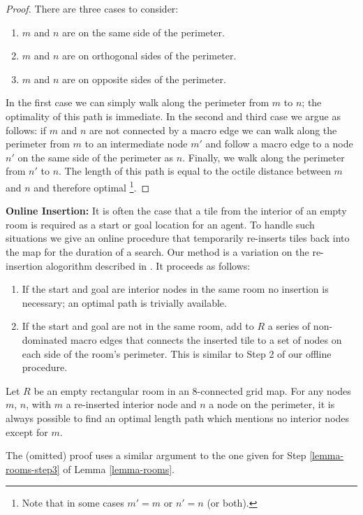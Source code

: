 \begin{proof}
There are three cases to consider:
\begin{enumerate}
\item{$m$ and $n$ are on the same side of the perimeter.}
\item{$m$ and $n$ are on orthogonal sides of the perimeter.}
\item{\label{lemma-rooms-step3} $m$ and $n$ are on opposite sides of the perimeter.}
\end{enumerate}
In the first case we can simply walk along the perimeter from $m$ to $n$; the optimality of this path is immediate. 
In the second and third case we argue as follows: if $m$ and $n$ are not connected by a macro edge
we can walk along the perimeter from $m$ to an intermediate node $m'$ and follow a macro edge to a node $n'$ on the 
same side of the perimeter as $n$. Finally, we walk along the perimeter from $n'$ to $n$.
The length of this path is equal to the octile distance between $m$ and $n$ and therefore optimal
\footnote{Note that in some cases $m' = m$ or $n' = n$ (or both).}.
\end{proof}

\noindent
\textbf{Online Insertion:}
It is often the case that a tile from the interior of an empty room is required as a start or goal location for an
agent. 
To handle such situations we give an online procedure that temporarily re-inserts tiles back into the map for the duration
of a search. 
Our method is a variation on the re-insertion alogorithm described in \cite{harabor10}. It proceeds as follows:

\begin{enumerate}
\item{If the start and goal are interior nodes in the same room no insertion is necessary; an optimal
path is trivially available. }
\item{If the start and goal are not in the same room, add to $R$ a series of non-dominated macro edges that connects
the inserted tile to a set of nodes on each side of the room's perimeter. This is similar to Step 2 of our offline procedure.}
\end{enumerate}
\begin{lemma}
\label{lemma-insertion}
Let $R$ be an empty rectangular room in an 8-connected grid map.
For any nodes $m$, $n$, with $m$ a re-inserted interior node and $n$ a node on the perimeter, it is always possible to
find an optimal length path which mentions no interior nodes except for $m$.
\end{lemma}
The (omitted) proof uses a similar argument to the one given for Step \ref{lemma-rooms-step3} of Lemma \ref{lemma-rooms}.

